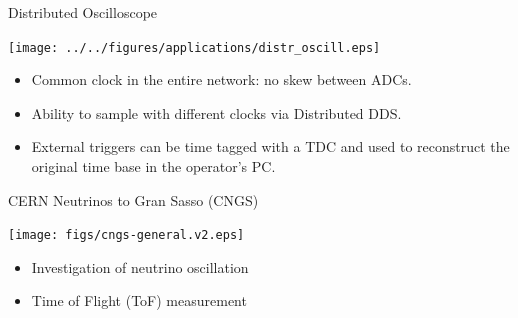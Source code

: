 \documentclass[compress,red]{beamer}
\begin{document}
\begin{frame}{Distributed Oscilloscope}
  \begin{center}
    \texttt{[image: ../../figures/applications/distr\_oscill.eps]}
    \end{center}
    \begin{block}{}
      \begin{itemize}
      \item Common clock in the entire network: no skew between ADCs.
      \item Ability to sample with different clocks via Distributed DDS.
      \item External triggers can be time tagged with a TDC and used to reconstruct the original time base in the operator's PC.
      \end{itemize}
    \end{block}
\end{frame}
\begin{frame}{CERN Neutrinos to Gran Sasso (CNGS)}

    \begin{center}
      \texttt{[image: figs/cngs-general.v2.eps]} 
    \end{center}

    \begin{center}
      \begin{itemize}
	\item Investigation of neutrino oscillation
	\item Time of Flight (ToF) measurement
      \end{itemize}

    \end{center}

\end{frame}
\end{document}

